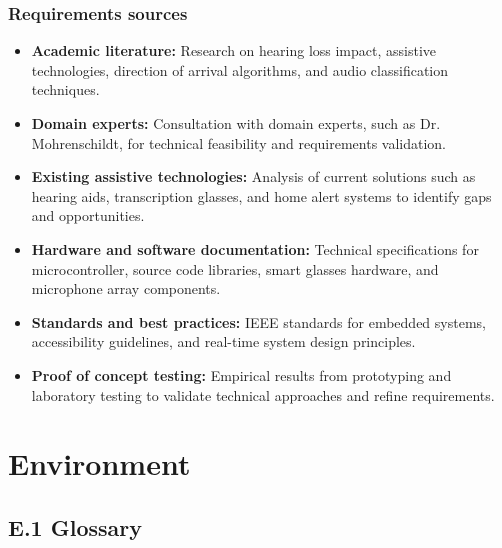 \documentclass[12pt]{article}
\theoremstyle{definition}
\begin{document}
\subsubsection{Requirements sources}

\begin{itemize}
\item \textbf{Academic literature:} Research on hearing loss impact, assistive
technologies, direction of arrival algorithms, and audio classification
techniques.

\item \textbf{Domain experts:}\label{itm:domain-experts} Consultation with
domain experts, such as Dr. Mohrenschildt, for technical feasibility and
requirements validation.

\item \textbf{Existing assistive technologies:} Analysis of current solutions
such as hearing aids, transcription glasses, and home alert systems to identify
gaps and opportunities.

\item \textbf{Hardware and software documentation:} Technical specifications for
microcontroller, source code libraries, smart glasses hardware, and microphone
array components.

\item \textbf{Standards and best practices:} IEEE standards for embedded
systems, accessibility guidelines, and real-time system design principles.

\item \textbf{Proof of concept testing:} Empirical results from prototyping and
laboratory testing to validate technical approaches and refine requirements.
\end{itemize}


\section{Environment}

\subsection{E.1 Glossary}
\end{document}
